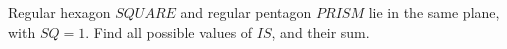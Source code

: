 Regular hexagon $SQUARE$ and regular pentagon $PRISM$ lie in the same plane, with $SQ=1$. Find all possible values of $IS$, and their sum.
